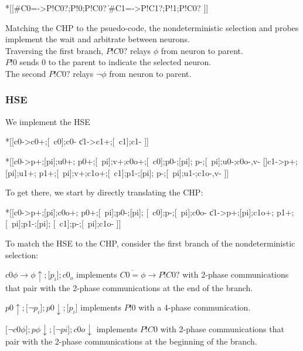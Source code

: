 \documentclass{article}
\begin{document}
\begin{csp}
*[[#{C0=\phi}->P!C0?;P!0;P!C0?
  \|#{C1=\phi}->P!C1?;P!1;P!C0?
 ]]
\end{csp}

\noindent
Matching the CHP to the psuedo-code, the nondeterministic selection and 
probes implement the wait and arbitrate between neurons. \\
Traversing the first branch, $P!C0?$ relays $\phi$ from neuron to parent. \\
$P!0$ sends $0$ to the parent to indicate the selected neuron. \\
The second $P!C0?$ relays $\neg\phi$ from neuron to parent.

\subsubsection*{HSE}

We implement the HSE

\begin{hse}
*[[c0\phi->c0+;[~c0\phi];c0-
  \|c1\phi->c1+;[~c1\phi];c1-
 ]]

*[[c0->p\phi+;[pi];u0+;
    p0+;[~pi];v+;c0o+;[~c0];p0-;[pi];
    p\phi-;[~pi];u0-;c0o-,v-
  []c1->p\phi+;[pi];u1+;
    p1+;[~pi];v+;c1o+;[~c1];p1-;[pi];
    p\phi-;[~pi];u1-;c1o-,v-
 ]]
\end{hse}

\noindent
To get there, we start by directly translating the CHP:

\begin{hse}
*[[c0\phi->p\phi+;[pi];c0o+;
    p0+;[~pi];p0-;[pi];
    [~c0\phi];p\phi-;[~pi];c0o-
  \|c1\phi->p\phi+;[pi];c1o+;
    p1+;[~pi];p1-;[pi];
    [~c1\phi];p\phi-;[~pi];c1o-
 ]]
\end{hse}

\noindent
To match the HSE to the CHP, consider the first branch of the nondeterministic
selection: 

$c0\phi\rightarrow\phi\uparrow;\texttt{[}p_i\texttt{]};c0_o$ implements 
$\overline{C0=\phi}\longrightarrow P!C0?$ with 2-phase communications that
pair with the 2-phase communications at the end of the branch.

$p0\uparrow;\texttt{[}\neg p_i\texttt{]};p0\downarrow;\texttt{[}p_i\texttt{]}$ implements $P!0$ with a 4-phase communication.

$\texttt{[}\neg c0\phi\texttt{]};p\phi\downarrow;\texttt{[}\neg pi\texttt{]};c0o\downarrow$ implements $P!C0$ with 2-phase communications that pair with the 
2-phase communications at the beginning of the branch. \\
\end{document}

